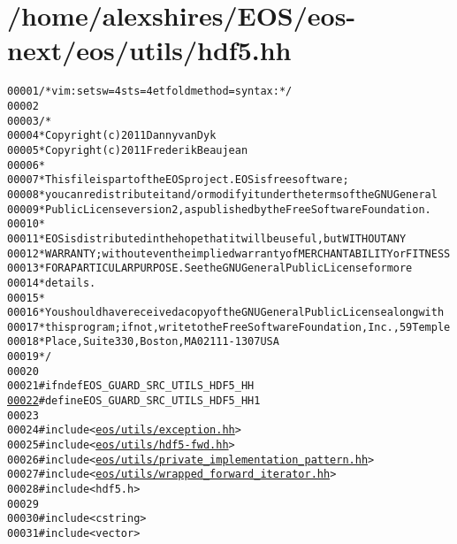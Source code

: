 \hypertarget{hdf5_8hh_source}{
\section{/home/alexshires/EOS/eos-\/next/eos/utils/hdf5.hh}
}


\begin{footnotesize}\begin{alltt}
00001 \textcolor{comment}{/* vim: set sw=4 sts=4 et foldmethod=syntax : */}
00002 
00003 \textcolor{comment}{/*}
00004 \textcolor{comment}{ * Copyright (c) 2011 Danny van Dyk}
00005 \textcolor{comment}{ * Copyright (c) 2011 Frederik Beaujean}
00006 \textcolor{comment}{ *}
00007 \textcolor{comment}{ * This file is part of the EOS project. EOS is free software;}
00008 \textcolor{comment}{ * you can redistribute it and/or modify it under the terms of the GNU General}
00009 \textcolor{comment}{ * Public License version 2, as published by the Free Software Foundation.}
00010 \textcolor{comment}{ *}
00011 \textcolor{comment}{ * EOS is distributed in the hope that it will be useful, but WITHOUT ANY}
00012 \textcolor{comment}{ * WARRANTY; without even the implied warranty of MERCHANTABILITY or FITNESS}
00013 \textcolor{comment}{ * FOR A PARTICULAR PURPOSE.  See the GNU General Public License for more}
00014 \textcolor{comment}{ * details.}
00015 \textcolor{comment}{ *}
00016 \textcolor{comment}{ * You should have received a copy of the GNU General Public License along with}
00017 \textcolor{comment}{ * this program; if not, write to the Free Software Foundation, Inc., 59 Temple}
00018 \textcolor{comment}{ * Place, Suite 330, Boston, MA  02111-1307  USA}
00019 \textcolor{comment}{ */}
00020 
00021 \textcolor{preprocessor}{#ifndef EOS\_GUARD\_SRC\_UTILS\_HDF5\_HH}
\hypertarget{hdf5_8hh_source_l00022}{}\hyperlink{hdf5_8hh_ab9d243c1633b2b4f6e51b80f8300d92e}{00022} \textcolor{preprocessor}{}\textcolor{preprocessor}{#define EOS\_GUARD\_SRC\_UTILS\_HDF5\_HH 1}
00023 \textcolor{preprocessor}{}
00024 \textcolor{preprocessor}{#include <\hyperlink{exception_8hh}{eos/utils/exception.hh}>}
00025 \textcolor{preprocessor}{#include <\hyperlink{hdf5-fwd_8hh}{eos/utils/hdf5-fwd.hh}>}
00026 \textcolor{preprocessor}{#include <\hyperlink{private__implementation__pattern_8hh}{eos/utils/private_implementation_pattern.hh}>}
00027 \textcolor{preprocessor}{#include <\hyperlink{wrapped__forward__iterator_8hh}{eos/utils/wrapped_forward_iterator.hh}>}
00028 \textcolor{preprocessor}{#include <hdf5.h>}
00029 
00030 \textcolor{preprocessor}{#include <cstring>}
00031 \textcolor{preprocessor}{#include <vector>}

\end{alltt}
\end{footnotesize}
